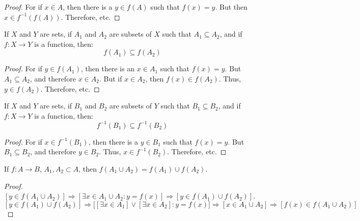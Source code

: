         \begin{proof}
            For if $x\in{A}$, then there is a
            $y\in{f}(A)$ such that $f(x)=y$. But then
            $x\in{f^{-1}(f(A))}$. Therefore, etc.
        \end{proof}
        \begin{theorem}
            If $X$ and $Y$ are sets, if $A_{1}$ and $A_{2}$ are
            subsets of $X$ such that $A_{1}\subseteq{A}_{2}$,
            and if $f:X\rightarrow{Y}$ is a function, then:
            \begin{equation}
                f(A_{1})\subseteq{f}(A_{2})
            \end{equation}
        \end{theorem}
        \begin{proof}
            For if $y\in{f}(A_{1})$, then there is an $x\in{A}_{1}$
            such that $f(x)=y$. But $A_{1}\subseteq{A}_{2}$, and
            therefore $x\in{A}_{2}$. But if $x\in{A}_{2}$, then
            $f(x)\in{f}(A_{2})$. Thus, $y\in{f}(A_{2})$. Therefore, etc.
        \end{proof}
        \begin{theorem}
            If $X$ and $Y$ are sets, if $B_{1}$ and $B_{2}$ are subsets of
            $Y$ such that $B_{1}\subseteq{B}_{2}$, and if $f:X\rightarrow{Y}$
            is a function, then:
            \begin{equation}
                f^{-1}(B_{1})\subseteq{f^{-1}}(B_{2})
            \end{equation}
        \end{theorem}
        \begin{proof}
            For if $x\in{f}^{-1}(B_{1})$, then there is a
            $y\in{B}_{1}$ such that $f(x)=y$. But
            $B_{1}\subseteq{B}_{2}$, and therefore $y\in{B}_{2}$.
            Thus, $x\in{f}^{-1}(B_{2})$. Therefore, etc.
        \end{proof}
        \begin{theorem}
        If $f:A\rightarrow B$, $A_1,A_2\subset A$, then $f(A_1 \cup A_2) = f(A_1)\cup f(A_2)$.
        \end{theorem}
        \begin{proof}
        $[y\in f(A_1\cup A_2)]\Rightarrow [\exists x\in A_1 \cup A_2:y=f(x)]\Rightarrow [y \in f(A_1)\cup f(A_2)]$. $[y\in f(A_1)\cup f(A_2)]\Rightarrow \big[[\exists x\in A_1] \lor[\exists x\in A_2]: y=f(x)\big]\Rightarrow [x\in A_1\cup A_2]\Rightarrow [f(x)\in f(A_1\cup A_2)]$
        \end{proof}
